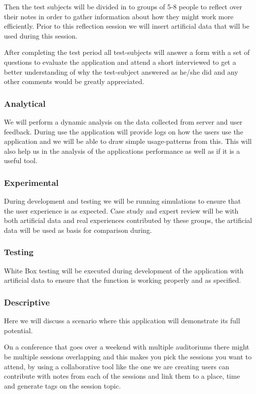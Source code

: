 Then the test subjects will be divided in to groups of 5-8 people to reflect over their notes in order to gather information about how they might work more efficiently. Prior to this reflection session we will insert artificial data that will be used during this session.

After completing the test period all test-subjects will answer a form with a set of questions to evaluate the application and attend a short interviewed to get a better understanding of why the test-subject answered as he/she did and any other comments would be greatly appreciated.
\subsubsection{Analytical}
We will perform a dynamic analysis on the data collected from server and user feedback. During use the application will provide logs on how the users use the application and we will be able to draw simple usage-patterns from this. This will also help us in the analysis of the applications performance as well as if it is a useful tool.
\subsubsection{Experimental}
During development and testing we will be running simulations to ensure that the user experience is as expected. Case study and expert review will be with both artificial data and real experiences contributed by these groups, the artificial data will be used as basis for comparison during.
\subsubsection{Testing}
White Box testing will be executed during development of the application with artificial data to ensure that the function is working properly and as specified.
\subsubsection{Descriptive}
Here we will discuss a scenario where this application will demonstrate its full potential.

On a conference that goes over a weekend with multiple auditoriums there might be multiple sessions overlapping and this makes you pick the sessions you want to attend, by using a collaborative tool like the one we are creating users can contribute with notes from each of the sessions and link them to a place, time and generate tags on the session topic. 


